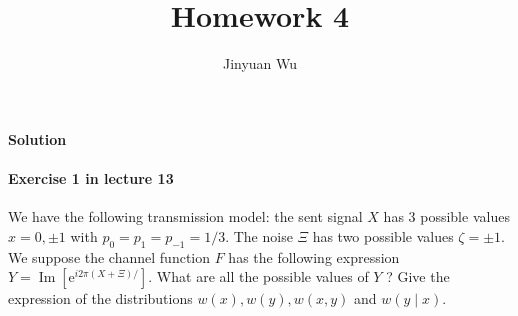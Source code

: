 \documentclass[hyperref, a4paper]{article}
\title{Homework 4}
\author{Jinyuan Wu}
\begin{document}
\maketitle

\paragraph{}

\paragraph{Solution} 

\paragraph{Exercise 1 in lecture 13} We have the following transmission model: the sent signal $X$ has 3 possible values $x=0, \pm 1$ with $p_0=p_1=p_{-1}=1 / 3$. The noise $\Xi$ has two possible values $\zeta=\pm 1$. We suppose the channel function $F$ has the following expression $Y=\operatorname{Im}\left[\mathrm{e}^{i 2 \pi(X+\Xi) / }\right]$. What are all the possible values of $Y$ ? Give the expression of the distributions $w(x), w(y), w(x, y)$ and $w(y \mid x)$.
\end{document}
